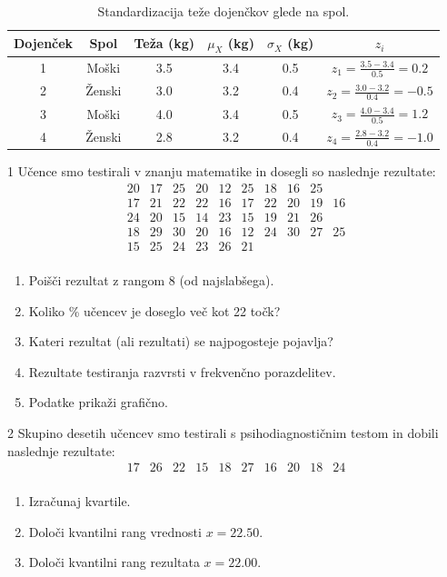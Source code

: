 \begin{table}[h!]
    \centering
    \begin{tabular}{cccccc}
    \toprule
    Dojenček & Spol & Teža (kg) & $\mu_X$ (kg) & $\sigma_X$ (kg) & $z_i$ \\
    \midrule
    1 & Moški & 3.5 & 3.4 & 0.5 & $z_1 = \frac{3.5 - 3.4}{0.5} = 0.2$ \\
    2 & Ženski & 3.0 & 3.2 & 0.4 & $z_2 = \frac{3.0 - 3.2}{0.4} = -0.5$ \\
    3 & Moški & 4.0 & 3.4 & 0.5 & $z_3 = \frac{4.0 - 3.4}{0.5} = 1.2$ \\
    4 & Ženski & 2.8 & 3.2 & 0.4 & $z_4 = \frac{2.8 - 3.2}{0.4} = -1.0$ \\
    \bottomrule
    \end{tabular}
    \caption{Standardizacija teže dojenčkov glede na spol.}
\end{table}

\begin{Vaje}{1}
    Učence smo testirali v znanju matematike in dosegli so naslednje rezultate:
\[
\begin{array}{cccccccccccccc}
20 & 17 & 25 & 20 & 12 & 25 & 18 & 16 & 25 \\
17 & 21 & 22 & 22 & 16 & 17 & 22 & 20 & 19 & 16 \\
24 & 20 & 15 & 14 & 23 & 15 & 19 & 21 & 26 \\
18 & 29 & 30 & 20 & 16 & 12 & 24 & 30 & 27 & 25 \\
15 & 25 & 24 & 23 & 26 & 21 \\
\end{array}
\]

\begin{enumerate}
\item Poišči rezultat z rangom 8 (od najslabšega).
\item Koliko \% učencev je doseglo več kot 22 točk?
\item Kateri rezultat (ali rezultati) se najpogosteje pojavlja?
\item Rezultate testiranja razvrsti v frekvenčno porazdelitev.
\item Podatke prikaži grafično.
\end{enumerate}
\end{Vaje}

\begin{Vaje}{2} 
        Skupino desetih učencev smo testirali s psihodiagnostičnim testom in dobili naslednje rezultate:
        \[
        \begin{array}{cccccccccc}
        17 & 26 & 22 & 15 & 18 & 27 & 16 & 20 & 18 & 24 \\
        \end{array}
        \]
        
        \begin{enumerate}
            \item Izračunaj kvartile.
            \item Določi kvantilni rang vrednosti $x = 22.50$.
            \item Določi kvantilni rang rezultata $x = 22.00$.
        \end{enumerate}
\end{Vaje}

